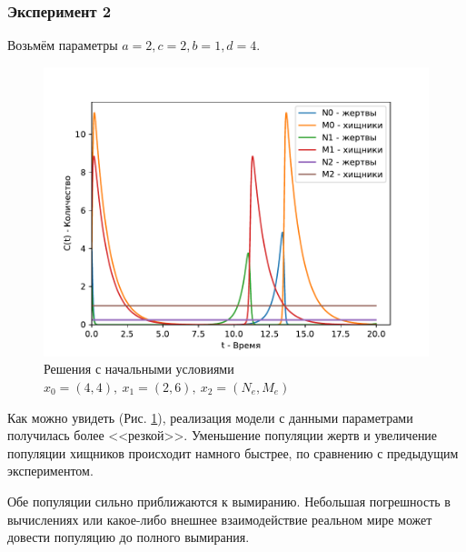        \subsubsection{Эксперимент 2}
        Возьмём параметры $a = 2, c = 2, b = 1, d = 4$.
        \begin{figure}[H]
            \centering
            \includegraphics[width=15cm]{pictures/population2.pdf}
            \caption{Решения с начальными условиями $x_0=(4,4), ~ x_1 = (2,6), ~ x_2 = (N_e, M_e)$}\label{exp2t}
        \end{figure}
        Как можно увидеть (Рис. \ref{exp2t}), реализация модели с данными параметрами получилась более <<резкой>>. Уменьшение популяции жертв и увеличение популяции хищников происходит намного быстрее, по сравнению с предыдущим экспериментом.

        Обе популяции сильно приближаются к вымиранию. Небольшая погрешность в вычислениях или какое-либо внешнее взаимодействие реальном мире может довести популяцию до полного вымирания.

